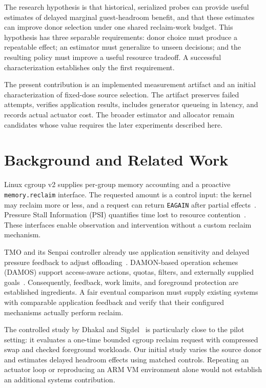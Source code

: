 \documentclass[conference]{IEEEtran}
\begin{document}
The research hypothesis is that historical, serialized probes can provide
useful estimates of delayed marginal guest-headroom benefit, and that these
estimates can improve donor selection under one shared reclaim-work budget.
This hypothesis has three separable requirements: donor choice must produce a
repeatable effect; an estimator must generalize to unseen decisions; and the
resulting policy must improve a useful resource tradeoff. A successful
characterization establishes only the first requirement.

The present contribution is an implemented measurement artifact and an initial
characterization of fixed-dose source selection. The artifact preserves failed
attempts, verifies application results, includes generator queueing in latency,
and records actual actuator cost. The broader estimator and allocator remain
candidates whose value requires the later experiments described here.

\section{Background and Related Work}
Linux cgroup v2 supplies per-group memory accounting and a proactive
\texttt{memory.reclaim} interface. The requested amount is a control input:
the kernel may reclaim more or less, and a request can return
\texttt{EAGAIN} after partial effects~\cite{cgroup}. Pressure Stall Information
(PSI) quantifies time lost to resource contention~\cite{psi}. These interfaces
enable observation and intervention without a custom reclaim mechanism.

TMO and its Senpai controller already use application sensitivity and delayed
pressure feedback to adjust offloading~\cite{tmo}. DAMON-based operation schemes
(DAMOS) support access-aware actions, quotas, filters, and externally supplied
goals~\cite{damon}. Consequently, feedback, work limits, and foreground
protection are established ingredients. A fair eventual comparison must supply
existing systems with comparable application feedback and verify that their
configured mechanisms actually perform reclaim.

The controlled study by Dhakal and Sigdel~\cite{bounded} is particularly close
to the pilot setting: it evaluates a one-time bounded cgroup reclaim request
with compressed swap and checked foreground workloads. Our initial study
varies the source donor and estimates delayed headroom effects using matched
controls. Repeating an actuator loop or reproducing an ARM VM environment alone
would not establish an additional systems contribution.
\end{document}
